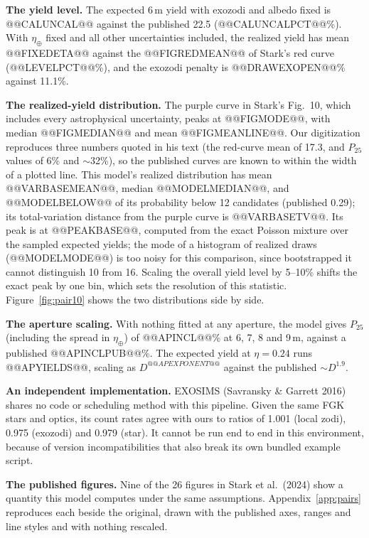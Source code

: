 \documentclass[11pt,a4paper]{article}
\begin{document}
\textbf{The yield level.} The expected 6\,m yield with exozodi and albedo fixed is @@CALUNCAL@@
against the published 22.5 (@@CALUNCALPCT@@\%). With $\eta_\oplus$ fixed and all other
uncertainties included, the realized yield has mean @@FIXEDETA@@ against the @@FIGREDMEAN@@ of
Stark's red curve (@@LEVELPCT@@\%), and the exozodi penalty is @@DRAWEXOPEN@@\% against 11.1\%.

\textbf{The realized-yield distribution.} The purple curve in Stark's Fig.~10, which includes
every astrophysical uncertainty, peaks at @@FIGMODE@@, with median @@FIGMEDIAN@@ and mean
@@FIGMEANLINE@@. Our digitization reproduces three numbers quoted in his text (the red-curve mean
of 17.3, and $P_{25}$ values of 6\% and $\sim$32\%), so the published curves are known to within
the width of a plotted line. This model's realized distribution has mean @@VARBASEMEAN@@, median
@@MODELMEDIAN@@, and @@MODELBELOW@@ of its probability below 12 candidates (published 0.29); its
total-variation distance from the purple curve is @@VARBASETV@@. Its peak is at @@PEAKBASE@@,
computed from the exact Poisson mixture over the sampled expected yields; the mode of a histogram
of realized draws (@@MODELMODE@@) is too noisy for this comparison, since bootstrapped it cannot
distinguish 10 from 16. Scaling the overall yield level by 5--10\% shifts the exact peak by one
bin, which sets the resolution of this statistic. Figure~\ref{fig:pair10} shows the two
distributions side by side.

\textbf{The aperture scaling.} With nothing fitted at any aperture, the model gives $P_{25}$
(including the spread in $\eta_\oplus$) of @@APINCL@@\% at 6, 7, 8 and 9\,m, against a published
@@APINCLPUB@@\%. The expected yield at $\eta = 0.24$ runs @@APYIELDS@@, scaling as
$D^{@@APEXPONENT@@}$ against the published $\sim D^{1.9}$.

\textbf{An independent implementation.} EXOSIMS (Savransky \& Garrett 2016) shares no code or
scheduling method with this pipeline. Given the same FGK stars and optics, its count rates agree
with ours to ratios of 1.001 (local zodi), 0.975 (exozodi) and 0.979 (star). It cannot be run end
to end in this environment, because of version incompatibilities that also break its own bundled
example script.

\textbf{The published figures.} Nine of the 26 figures in Stark et al.\ (2024) show a quantity
this model computes under the same assumptions. Appendix~\ref{app:pairs} reproduces each beside the
original, drawn with the published axes, ranges and line styles and with nothing rescaled.
\end{document}
